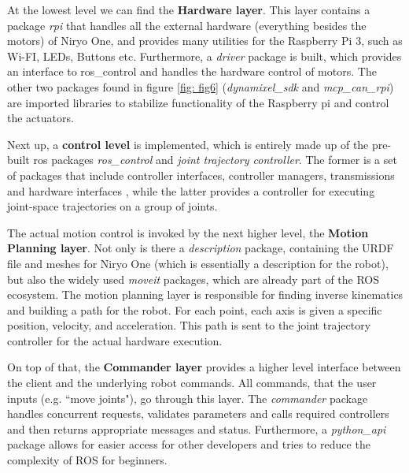 \documentclass[%
paper=A4,               %
twoside=true,           %
openright,              %
11pt,                   %
bibliography=totoc,     %
titlepage=on,           %
DIV=12,                 %
BCOR=1.5cm,             %
parskip=half,            %
final
]{scrreprt}
\begin{document}
	At the lowest level we can find the \textbf{Hardware layer}. This layer contains a package \textit{rpi} that handles all the external hardware (everything besides the motors) of Niryo One, and provides many utilities for the Raspberry Pi 3, such as Wi-FI, LEDs, Buttons etc. Furthermore, a \textit{driver} package is built, which provides an interface to ros\_control and handles the hardware control of motors. The other two packages found in figure \ref{fig: fig6} (\textit{dynamixel\_sdk} and \textit{mcp\_can\_rpi}) are imported libraries to stabilize functionality of the Raspberry pi and control the actuators. \autocite{roboticsNiryoOneROS2024} \newline
	
	Next up, a \textbf{control level} is implemented, which is entirely made up of the pre-built ros packages \textit{ros\_control} and \textit{joint trajectory controller}. The former is a set of packages that include controller interfaces, controller managers, transmissions and hardware interfaces \autocite{ros.orgROSControl2024a}, while the latter provides a controller for executing joint-space trajectories on a group of joints. \autocite{ros.orgJointTrajectoryController2024} \newline
	
	The actual motion control is invoked by the next higher level, the \textbf{Motion Planning layer}. Not only is there a \textit{description} package, containing the URDF file and meshes for Niryo One (which is essentially a description for the robot), but also the widely used \textit{moveit} packages, which are already part of the ROS ecosystem. The motion planning layer is responsible for finding inverse kinematics and building a path for the robot.\autocite{roboticsGetStartedNiryo2024,ros.orgMoveItConcepts2024} For each point, each axis is given a specific position, velocity, and acceleration. This path is sent to the joint trajectory controller for the actual hardware execution. \autocite{roboticsGetStartedNiryo2024}
	
	On top of that, the \textbf{Commander layer} provides a higher level interface between the client and the underlying robot commands. All commands, that the user inputs (e.g. ``move joints"), go through this layer. The \textit{commander} package handles concurrent requests, validates parameters and calls required controllers and then returns appropriate messages and status. 
	Furthermore, a \textit{python\_api} package allows for easier access for other developers and tries to reduce the complexity of ROS for beginners. \autocite{roboticsGetStartedNiryo2024,roboticsNiryoOneROS2024}
	
\end{document}
